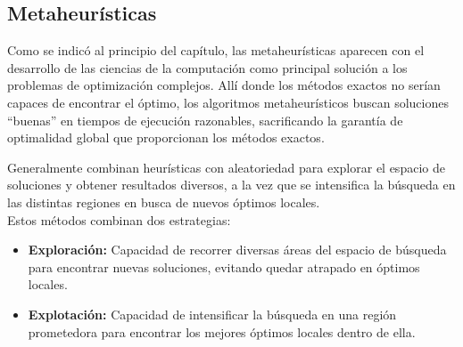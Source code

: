 \documentclass[12pt,a4paper]{book}
\begin{document}
\subsection{Metaheurísticas}
Como se indicó al principio del capítulo, las metaheurísticas\cite{metaheuristicos} aparecen con el desarrollo de las ciencias de la computación como principal solución a los problemas de optimización complejos. Allí donde los métodos exactos no serían capaces de encontrar el óptimo,
los algoritmos metaheurísticos buscan soluciones ``buenas'' en tiempos de ejecución razonables, sacrificando la garantía de optimalidad global que proporcionan los métodos exactos.

Generalmente combinan heurísticas con aleatoriedad para explorar el espacio de soluciones y obtener resultados diversos, a la vez que se intensifica la búsqueda en las distintas regiones en busca de nuevos óptimos locales.\\
Estos métodos combinan dos estrategias:
\begin{itemize}
    \item \textbf{Exploración:} Capacidad de recorrer diversas áreas del espacio de búsqueda para encontrar nuevas soluciones, evitando quedar atrapado en óptimos locales.
    \item \textbf{Explotación:} Capacidad de intensificar la búsqueda en una región prometedora para encontrar los mejores óptimos locales dentro de ella.
\end{itemize}
\end{document}
